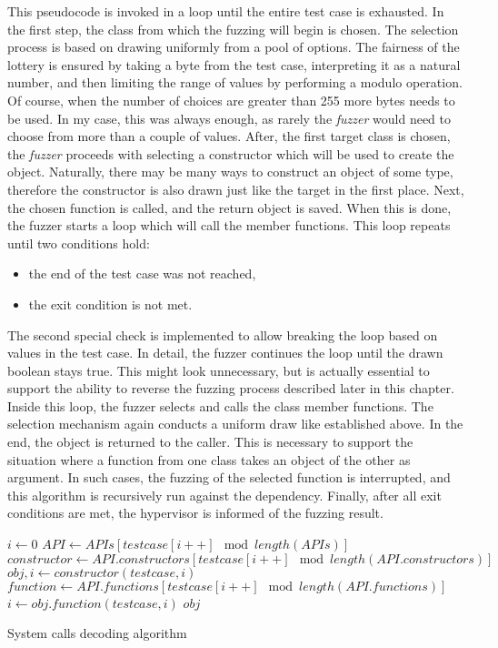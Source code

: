 This pseudocode is invoked in a loop until the entire test case is exhausted. In the first step, the class from which the fuzzing will begin is chosen. The selection process is based on drawing uniformly from a pool of options. The fairness of the lottery is ensured by taking a byte from the test case, interpreting it as a natural number, and then limiting the range of values by performing a modulo operation. Of course, when the number of choices are greater than 255 more bytes needs to be used. In my case, this was always enough, as rarely the \textit{fuzzer} would need to choose from more than a couple of values. After, the first target class is chosen, the \textit{fuzzer} proceeds with selecting a constructor which will be used to create the object. Naturally, there may be many ways to construct an object of some type, therefore the constructor is also drawn just like the target in the first place. Next, the chosen function is called, and the return object is saved. When this is done, the fuzzer starts a loop which will call the member functions. This loop repeats until two conditions hold:
\begin{itemize}
    \item the end of the test case was not reached,
    \item the exit condition is not met.
\end{itemize}
The second special check is implemented to allow breaking the loop based on values in the test case. In detail, the fuzzer continues the loop until the drawn boolean stays true. This might look unnecessary, but is actually essential to support the ability to reverse the fuzzing process described later in this chapter. Inside this loop, the fuzzer selects and calls the class member functions. The selection mechanism again conducts a uniform draw like established above. In the end, the object is returned to the caller. This is necessary to support the situation where a function from one class takes an object of the other as argument. In such cases, the fuzzing of the selected function is interrupted, and this algorithm is recursively run against the dependency. Finally, after all exit conditions are met, the hypervisor is informed of the fuzzing result.

\begin{algorithm}
    \begin{algorithmic}
        \State $i \gets 0$
        \State $API \gets APIs[testcase[i++] \mod length(APIs)]$
        \State $constructor \gets API.constructors[testcase[i++] \mod length(API.constructors)]$
        \State $obj, i \gets constructor(testcase, i)$
            \State $function \gets API.functions[testcase[i++] \mod length(API.functions)]$
            \State $i \gets obj.function(testcase, i)$
        \EndWhile
        \State \Return $obj$
    \end{algorithmic}
    \caption{System calls decoding algorithm}
    \label{alg:syscall_decode}
\end{algorithm}

